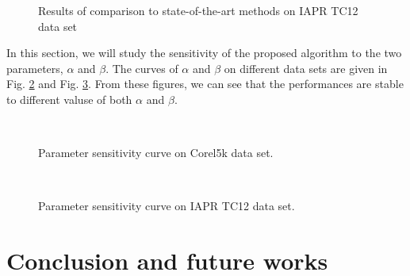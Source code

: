 \documentclass[runningheads,a4paper]{llncs}
\begin{document}
\begin{figure}[!htb]
\centering
{}
\caption{Results of comparison to state-of-the-art methods on IAPR TC12 data set}
\label{fig:IAPR}
\end{figure}

In this section, we will study the sensitivity of the proposed algorithm to the two parameters, $\alpha$ and $\beta$. The curves of $\alpha$ and $\beta$ on different data sets are given in Fig. \ref{fig:Corel_alpah} and Fig. \ref{fig:IAPR_alpah}. From these figures, we can see that the performances are stable to different valuse of  both $\alpha$ and $\beta$.

\begin{figure}[!htb]
  \centering
{}
\\
\caption{Parameter sensitivity curve on Corel5k data set.}
\label{fig:Corel_alpah}
\end{figure}


\begin{figure}[!htb]
  \centering
{}
\\
\caption{Parameter sensitivity curve on IAPR TC12 data set.}
\label{fig:IAPR_alpah}
\end{figure}



\section{Conclusion and future works}
\label{sec:conclusion}
\end{document}
